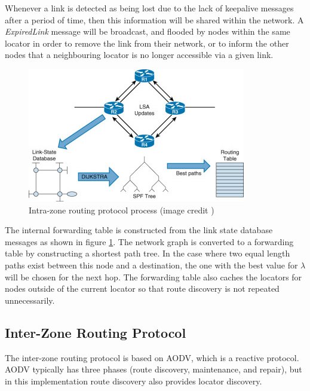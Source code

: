 \documentclass[12pt]{article}
\begin{document}
Whenever a link is detected as being lost due to the lack of keepalive messages after a period of time, then this information will be shared within the network. A \emph{ExpiredLink} message will be broadcast, and flooded by nodes within the same locator in order to remove the link from their network, or to inform the other nodes that a neighbouring locator is no longer accessible via a given link.

\begin{figure}[!ht]
	\centering
	\includegraphics[width=\linewidth]{images/ldb}
	\caption{Intra-zone routing protocol process (image credit \cite{ldb})}
	\label{fig:lsbexchange}
\end{figure}

The internal forwarding table is constructed from the link state database messages as shown in figure \ref{fig:lsbexchange}. The network graph is converted to a forwarding table by constructing a shortest path tree. In the case where two equal length paths exist between this node and a destination, the one with the best value for $\lambda$ will be chosen for the next hop. The forwarding table also caches the locators for nodes outside of the current locator so that route discovery is not repeated unnecessarily.

\subsection{Inter-Zone Routing Protocol}

The inter-zone routing protocol is based on AODV, which is a reactive protocol. AODV typically has three phases (route discovery, maintenance, and repair), but in this implementation route discovery also provides locator discovery.
\end{document}
